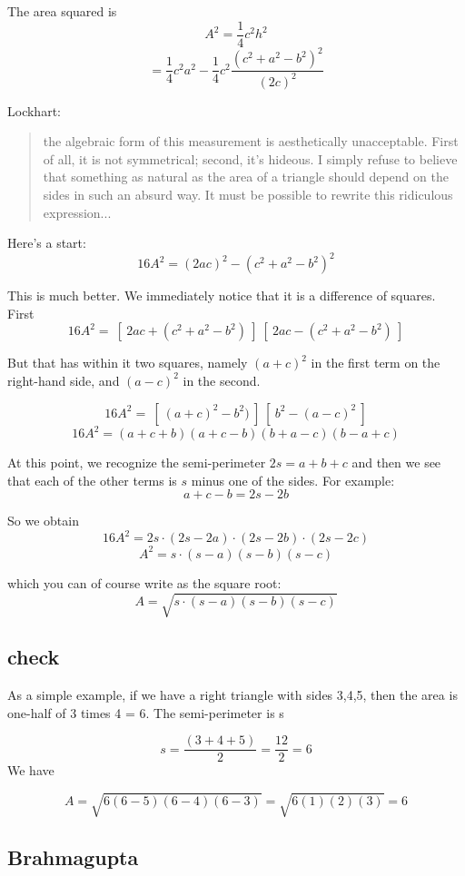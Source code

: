 \documentclass[11pt, oneside]{article}
\begin{document}
The area squared is
\[ A^2 = \frac{1}{4}c^2 h^2 \]
\[ = \frac{1}{4} c^2 a^2 - \frac{1}{4} c^2 \frac{(c^2 + a^2-b^2)^2}{(2c)^2}  \]

Lockhart:

\begin{quote}
the algebraic form of this measurement is aesthetically unacceptable. First of all, it is not symmetrical; second, it's hideous. I simply refuse to believe that something as natural as the area of a triangle should depend on the sides in such an absurd way. It must be possible to rewrite this ridiculous expression...
\end{quote}

Here's a start:
\[ 16A^2 = (2ac)^2 - (c^2 + a^2-b^2)^2 \]

This is much better.  We immediately notice that it is a difference of squares.  First
\[ 16A^2 = \ [ \ 2ac + (c^2 + a^2-b^2) \ ] \ [ \ 2ac - (c^2 + a^2-b^2) \ ]  \]

But that has within it two squares, namely $(a + c)^2$ in the first term on the right-hand side, and $(a - c)^2$ in the second.

\[ 16A^2 = \ [ \ (a + c)^2 -b^2) \ ] \ [ \ b^2 - (a - c)^2 \ ]  \]
\[ 16A^2 =  (a + c + b)(a + c - b)(b + a - c)(b - a + c) \]

At this point, we recognize the semi-perimeter $2s = a + b + c$ and then we see that each of the other terms is $s$ minus one of the sides.  For example:
\[ a + c - b = 2s - 2b \]

So we obtain
\[ 16A^2 = 2s \cdot (2s - 2a) \cdot (2s - 2b) \cdot (2s - 2c) \]
\[ A^2 = s \cdot (s - a)(s - b)(s - c) \]

which you can of course write as the square root:
\[ A = \sqrt{s \cdot (s - a)(s - b)(s - c)} \]


\subsection*{check}
As a simple example, if we have a right triangle with sides 3,4,5, then the area is one-half of 3 times 4 = 6.  The semi-perimeter is s

\[ s = \frac{(3 + 4 + 5)}{2} = \frac{12}{2} = 6 \]
We have

\[ A =  \sqrt { 6 (6-5) (6-4) (6-3) } =  \sqrt { 6 (1) (2) (3) } = 6 \]

\subsection*{Brahmagupta}
\end{document}
